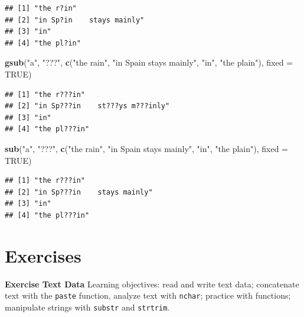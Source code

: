 \documentclass[
]{krantz}
\newenvironment{Shaded}{\begin{snugshade}}{\end{snugshade}}
\newcommand{\DataTypeTok}[1]{\textcolor[rgb]{0.13,0.29,0.53}{#1}}
\newcommand{\KeywordTok}[1]{\textcolor[rgb]{0.13,0.29,0.53}{\textbf{#1}}}
\newcommand{\NormalTok}[1]{#1}
\newcommand{\OtherTok}[1]{\textcolor[rgb]{0.56,0.35,0.01}{#1}}
\newcommand{\StringTok}[1]{\textcolor[rgb]{0.31,0.60,0.02}{#1}}
\begin{document}
\begin{verbatim}
## [1] "the r?in"                
## [2] "in Sp?in    stays mainly"
## [3] "in"                      
## [4] "the pl?in"
\end{verbatim}

\begin{Shaded}
\begin{Highlighting}[]
\KeywordTok{gsub}\NormalTok{(}\StringTok{"a"}\NormalTok{, }\StringTok{"???"}\NormalTok{, }\KeywordTok{c}\NormalTok{(}\StringTok{"the rain"}\NormalTok{, }\StringTok{"in Spain    stays mainly"}\NormalTok{, }\StringTok{"in"}\NormalTok{, }
                   \StringTok{"the plain"}\NormalTok{), }\DataTypeTok{fixed =} \OtherTok{TRUE}\NormalTok{)}
\end{Highlighting}
\end{Shaded}

\begin{verbatim}
## [1] "the r???in"                    
## [2] "in Sp???in    st???ys m???inly"
## [3] "in"                            
## [4] "the pl???in"
\end{verbatim}

\begin{Shaded}
\begin{Highlighting}[]
\KeywordTok{sub}\NormalTok{(}\StringTok{"a"}\NormalTok{, }\StringTok{"???"}\NormalTok{, }\KeywordTok{c}\NormalTok{(}\StringTok{"the rain"}\NormalTok{, }\StringTok{"in Spain    stays mainly"}\NormalTok{, }\StringTok{"in"}\NormalTok{, }
                  \StringTok{"the plain"}\NormalTok{), }\DataTypeTok{fixed =} \OtherTok{TRUE}\NormalTok{)}
\end{Highlighting}
\end{Shaded}

\begin{verbatim}
## [1] "the r???in"                
## [2] "in Sp???in    stays mainly"
## [3] "in"                        
## [4] "the pl???in"
\end{verbatim}

\hypertarget{textEx}{%
\section{Exercises}\label{textEx}}

\textbf{Exercise Text Data} Learning objectives: read and write text data; concatenate text with the \texttt{paste} function, analyze text with \texttt{nchar}; practice with functions; manipulate strings with \texttt{substr} and \texttt{strtrim}.
\end{document}
